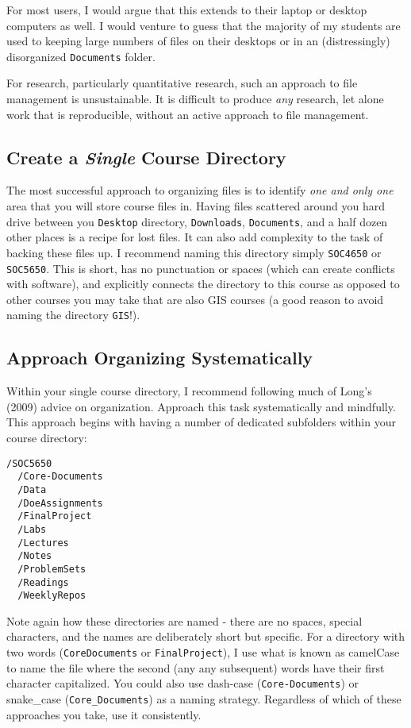 \documentclass[]{book}
\begin{document}
For most users, I would argue that this extends to their laptop or
desktop computers as well. I would venture to guess that the majority of
my students are used to keeping large numbers of files on their desktops
or in an (distressingly) disorganized \texttt{Documents} folder.

For research, particularly quantitative research, such an approach to
file management is unsustainable. It is difficult to produce \emph{any}
research, let alone work that is reproducible, without an active
approach to file management.

\subsection{\texorpdfstring{Create a \emph{Single} Course
Directory}{Create a Single Course Directory}}\label{create-a-single-course-directory}

The most successful approach to organizing files is to identify
\emph{one and only one} area that you will store course files in. Having
files scattered around you hard drive between you \texttt{Desktop}
directory, \texttt{Downloads}, \texttt{Documents}, and a half dozen
other places is a recipe for lost files. It can also add complexity to
the task of backing these files up. I recommend naming this directory
simply \texttt{SOC4650} or \texttt{SOC5650}. This is short, has no
punctuation or spaces (which can create conflicts with software), and
explicitly connects the directory to this course as opposed to other
courses you may take that are also GIS courses (a good reason to avoid
naming the directory \texttt{GIS}!).

\subsection{Approach Organizing
Systematically}\label{approach-organizing-systematically}

Within your single course directory, I recommend following much of
Long's (2009) advice on organization. Approach this task systematically
and mindfully. This approach begins with having a number of dedicated
subfolders within your course directory:

\begin{verbatim}
/SOC5650
  /Core-Documents
  /Data
  /DoeAssignments
  /FinalProject
  /Labs
  /Lectures
  /Notes
  /ProblemSets
  /Readings
  /WeeklyRepos
\end{verbatim}

Note again how these directories are named - there are no spaces,
special characters, and the names are deliberately short but specific.
For a directory with two words (\texttt{CoreDocuments} or
\texttt{FinalProject}), I use what is known as camelCase to name the
file where the second (any any subsequent) words have their first
character capitalized. You could also use dash-case
(\texttt{Core-Documents}) or snake\_case (\texttt{Core\_Documents}) as a
naming strategy. Regardless of which of these approaches you take, use
it consistently.
\end{document}
